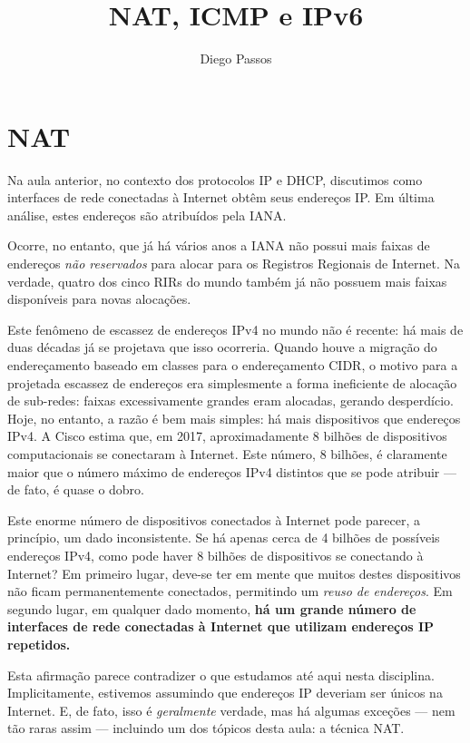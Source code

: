 \documentclass{article}
\title{NAT, ICMP e IPv6}
\author{Diego Passos}
\date{}  %
\begin{document}
\maketitle%

\section{NAT}

Na aula anterior, no contexto dos protocolos IP e DHCP, discutimos como interfaces de rede conectadas à Internet obtêm seus endereços IP. Em última análise, estes endereços são atribuídos pela IANA. 

Ocorre, no entanto, que já há vários anos a IANA não possui mais faixas de endereços \textit{não reservados} para alocar para os Registros Regionais de Internet. Na verdade, quatro dos cinco RIRs do mundo também já não possuem mais faixas disponíveis para novas alocações.

Este fenômeno de escassez de endereços IPv4 no mundo não é recente: há mais de duas décadas já se projetava que isso ocorreria. Quando houve a migração do endereçamento baseado em classes para o endereçamento CIDR, o motivo para a projetada escassez de endereços era simplesmente a forma ineficiente de alocação de sub-redes: faixas excessivamente grandes eram alocadas, gerando desperdício. Hoje, no entanto, a razão é bem mais simples: há mais dispositivos que endereços IPv4. A Cisco estima que, em 2017, aproximadamente 8 bilhões de dispositivos computacionais se conectaram à Internet. Este número, 8 bilhões, é claramente maior que o número máximo de endereços IPv4 distintos que se pode atribuir --- de fato, é quase o dobro.

Este enorme número de dispositivos conectados à Internet pode parecer, a princípio, um dado inconsistente. Se há apenas cerca de 4 bilhões de possíveis endereços IPv4, como pode haver 8 bilhões de dispositivos se conectando à Internet? Em primeiro lugar, deve-se ter em mente que muitos destes dispositivos não ficam permanentemente conectados, permitindo um \textit{reuso de endereços}. Em segundo lugar, em qualquer dado momento, \textbf{há um grande número de interfaces de rede conectadas à Internet que utilizam endereços IP repetidos.}

Esta afirmação parece contradizer o que estudamos até aqui nesta disciplina. Implicitamente, estivemos assumindo que endereços IP deveriam ser únicos na Internet. E, de fato, isso é \textit{geralmente} verdade, mas há algumas exceções --- nem tão raras assim --- incluindo um dos tópicos desta aula: a técnica NAT.
\end{document}
